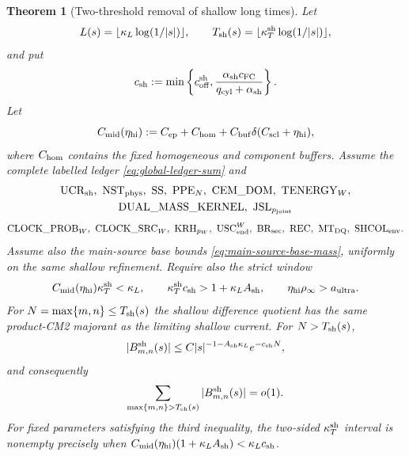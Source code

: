 \documentclass[11pt]{article}
\newtheorem{theorem}{Theorem}[section]
\begin{document}
\begin{theorem}[Two-threshold removal of shallow long times]
\label{thm:shallow-two-threshold}
Let
\[
 L(s)=\lfloor\kappa_L\log(1/|s|)\rfloor,
 \qquad T_{\rm sh}(s)=\lfloor\kappa_T^{\rm sh}\log(1/|s|)\rfloor,
\]
and put
\begin{equation}
\label{eq:shallow-collar-rate}
 c_{\rm sh}:=\min\left\{c_{\rm off}^{\rm sh},
 \frac{\alpha_{\rm sh}c_{\rm FC}}
 {q_{\rm cyl}+\alpha_{\rm sh}}\right\}.
\end{equation}
Let
\begin{equation}
\label{eq:intermediate-resolving-constant}
 C_{\rm mid}(\eta_{\rm hi})
 :=C_{\rm ep}+C_{\rm hom}
   +C_{\rm buf}\delta(C_{\rm scl}+\eta_{\rm hi}),
\end{equation}
where $C_{\rm hom}$ contains the fixed homogeneous and component buffers.
Assume the complete labelled ledger \eqref{eq:global-ledger-sum} and
\[
 \begin{gathered}
 \mathrm{UCR}_{\rm sh},\ \mathrm{NST}_{\rm phys},\ \mathrm{SS},\
 \mathrm{PPE}_{N},\ \mathrm{CEM\_DOM},\ \mathrm{TENERGY}_{W},\\
 \mathrm{DUAL\_MASS\_KERNEL},\ \mathrm{JSL}_{p_{\rm joint}}
 \end{gathered}
\]
\[
 \mathrm{CLOCK\_PROB}_{W},\ \mathrm{CLOCK\_SRC}_{W},\
 \mathrm{KRH}_{p_W},\ \mathrm{USC}_{\rm end}^{W},\
 \mathrm{BR}_{\rm sec},\ \mathrm{REC},\ \mathrm{MT}_{\rm DQ},\
 \mathrm{SHCOL}_{\rm env}.
\]
Assume also the main-source base bounds
\eqref{eq:main-source-base-mass}, uniformly on the same shallow refinement.
Require also the strict window
\begin{equation}
\label{eq:shallow-time-window}
 C_{\rm mid}(\eta_{\rm hi})\kappa_T^{\rm sh}<\kappa_L,
 \qquad
 \kappa_T^{\rm sh}c_{\rm sh}>1+\kappa_LA_{\rm sh},
 \qquad \eta_{\rm hi}\rho_\infty>a_{\rm ultra}.
\end{equation}
For $N=\max\{m,n\}\le T_{\rm sh}(s)$ the shallow difference quotient has
the same product-CM2 majorant as the limiting shallow current.  For
$N>T_{\rm sh}(s)$,
\begin{equation}
\label{eq:shallow-long-time-bound}
 |B^{\rm sh}_{m,n}(s)|
 \le C|s|^{-1-A_{\rm sh}\kappa_L}e^{-c_{\rm sh}N},
\end{equation}
and consequently
\begin{equation}
\label{eq:shallow-long-time-sum}
 \sum_{\max\{m,n\}>T_{\rm sh}(s)}
 |B^{\rm sh}_{m,n}(s)|=o(1).
\end{equation}
For fixed parameters satisfying the third inequality, the two-sided
$\kappa_T^{\rm sh}$ interval is nonempty precisely when
$C_{\rm mid}(\eta_{\rm hi})(1+\kappa_LA_{\rm sh})
 <\kappa_Lc_{\rm sh}$.
\end{theorem}
\end{document}
